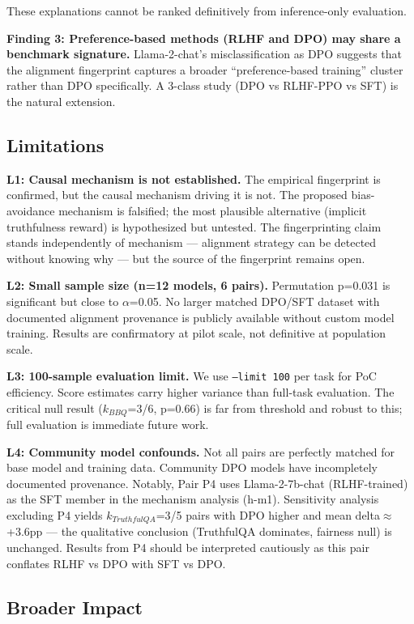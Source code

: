 These explanations cannot be ranked definitively from inference-only evaluation.

\textbf{Finding 3: Preference-based methods (RLHF and DPO) may share a benchmark signature.}
Llama-2-chat's misclassification as DPO suggests that the alignment fingerprint captures
a broader ``preference-based training'' cluster rather than DPO specifically. A 3-class
study (DPO vs RLHF-PPO vs SFT) is the natural extension.

\subsection{Limitations}

\textbf{L1: Causal mechanism is not established.} The empirical fingerprint is confirmed, but
the causal mechanism driving it is not. The proposed bias-avoidance mechanism is falsified;
the most plausible alternative (implicit truthfulness reward) is hypothesized but untested.
The fingerprinting claim stands independently of mechanism --- alignment strategy can be
detected without knowing why --- but the source of the fingerprint remains open.

\textbf{L2: Small sample size (n=12 models, 6 pairs).} Permutation p=0.031 is significant but
close to $\alpha$=0.05. No larger matched DPO/SFT dataset with documented alignment provenance
is publicly available without custom model training. Results are confirmatory at pilot
scale, not definitive at population scale.

\textbf{L3: 100-sample evaluation limit.} We use \texttt{--limit 100} per task for PoC efficiency.
Score estimates carry higher variance than full-task evaluation. The critical null result
($k_{BBQ}$=3/6, p=0.66) is far from threshold and robust to this; full evaluation is
immediate future work.

\textbf{L4: Community model confounds.} Not all pairs are perfectly matched for base model
and training data. Community DPO models have incompletely documented provenance.
Notably, Pair P4 uses Llama-2-7b-chat (RLHF-trained) as the SFT member in the mechanism
analysis (h-m1). Sensitivity analysis excluding P4 yields $k_{TruthfulQA}$=3/5 pairs with
DPO higher and mean delta$\approx$+3.6pp --- the qualitative conclusion (TruthfulQA dominates,
fairness null) is unchanged. Results from P4 should be interpreted cautiously as this
pair conflates RLHF vs DPO with SFT vs DPO.

\subsection{Broader Impact}


